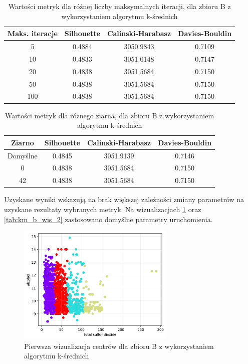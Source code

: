 \documentclass[a4paper,11pt]{article}
\begin{document}
\begin{table}[H]
    \centering
    \begin{tabular}{|c|c|c|c|}
    \hline
    \textbf{Maks. iteracje} & \textbf{Silhouette} & \textbf{Calinski-Harabasz} & \textbf{Davies-Bouldin} \\ \hline
    5   & 0.4884 & 3050.9843 & 0.7109 \\ \hline
    10  & 0.4833 & 3051.0148 & 0.7147 \\ \hline
    20  & 0.4838 & 3051.5684 & 0.7150 \\ \hline
    50  & 0.4838 & 3051.5684 & 0.7150 \\ \hline
    100 & 0.4838 & 3051.5684 & 0.7150 \\ \hline
    \end{tabular}
    \caption{Wartości metryk dla różnej liczby maksymalnych iteracji, dla zbioru B z wykorzystaniem algorytmu k-średnich}
    \label{tab:km_b_2}
\end{table}

\begin{table}[H]
    \centering
    \begin{tabular}{|c|c|c|c|}
    \hline
    \textbf{Ziarno} & \textbf{Silhouette} & \textbf{Calinski-Harabasz} & \textbf{Davies-Bouldin} \\ \hline
    Domyślne & 0.4845 & 3051.9139 & 0.7146 \\ \hline
    0        & 0.4838 & 3051.5684 & 0.7150 \\ \hline
    42       & 0.4838 & 3051.5684 & 0.7150 \\ \hline
    \end{tabular}
    \caption{Wartości metryk dla różnego ziarna, dla zbioru B z wykorzystaniem algorytmu k-średnich}
    \label{tab:km_b_3}
\end{table}

Uzyskane wyniki wskazują na brak większej zależności zmiany parametrów na uzyskane rezultaty wybranych metryk. Na wizualizacjach \ref{tab:km_b_wis_1} oraz \ref{tab:km_b_wis_2} zastosowano domyślne parametry uruchomienia.

\begin{figure}[H]
    \centering
    \includegraphics[width=0.67\textwidth]{images2/kmeans/Kmeans_Wines_1.png}
    \caption{Pierwsza wizualizacja centrów dla zbioru B z wykorzystaniem algorytmu k-średnich}
    \label{tab:km_b_wis_1}
\end{figure}
\end{document}

